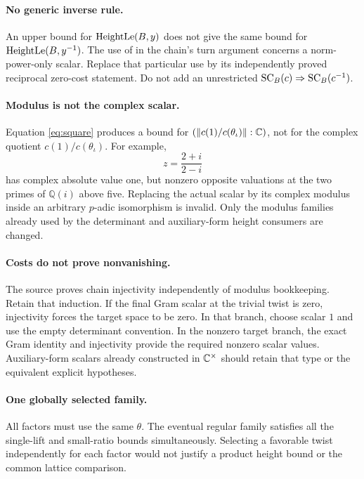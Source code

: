 \paragraph{No generic inverse rule.}
An upper bound for \(\operatorname{HeightLe}(B,y)\) does not give the same bound for
\(\operatorname{HeightLe}(B,y^{-1})\). The use of  in the
chain's turn argument concerns a norm-power-only scalar. Replace that
particular use by its independently proved reciprocal zero-cost statement.
Do not add an unrestricted \(\operatorname{SC}_B(c)\Rightarrow\operatorname{SC}_B(c^{-1})\).

\paragraph{Modulus is not the complex scalar.}
Equation \eqref{eq:square} produces a bound for
\((\left\lVert c(1)/c(\theta_\iota)\right\rVert:\mathbb C)\), not for the complex quotient
\(c(1)/c(\theta_\iota)\).
For example,
\[
 z=\frac{2+i}{2-i}
\]
has complex absolute value one, but nonzero opposite valuations at the
two primes of \(\mathbb Q(i)\) above five. Replacing the actual scalar
by its complex modulus inside an arbitrary \(p\)-adic isomorphism is
invalid. Only the modulus families already used by the determinant and
auxiliary-form height consumers are changed.

\paragraph{Costs do not prove nonvanishing.}
The source proves chain injectivity independently of modulus bookkeeping.
Retain that induction. If the final Gram scalar at the trivial twist is
zero, injectivity forces the target space to be zero. In that branch,
choose scalar \(1\) and use the empty determinant convention. In the
nonzero target branch, the exact Gram identity and injectivity provide
the required nonzero scalar values.
Auxiliary-form scalars already constructed in \(\mathbb C^\times\) should retain
that type or the equivalent explicit hypotheses.

\paragraph{One globally selected family.}
All factors must use the same \(\theta\). The eventual regular family
satisfies all the single-lift and small-ratio bounds simultaneously.
Selecting a favorable twist independently for each factor would not
justify a product height bound or the common lattice comparison.
